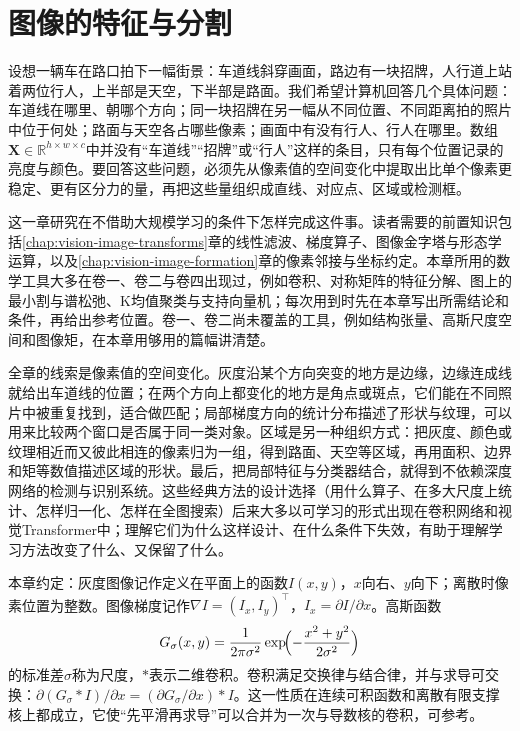 \chapter{图像的特征与分割}
\label{chap:vision-image-features}

设想一辆车在路口拍下一幅街景：车道线斜穿画面，路边有一块招牌，人行道上站着两位行人，上半部是天空，下半部是路面。我们希望计算机回答几个具体问题：车道线在哪里、朝哪个方向；同一块招牌在另一幅从不同位置、不同距离拍的照片中位于何处；路面与天空各占哪些像素；画面中有没有行人、行人在哪里。数组$\bm X\in\mathbb R^{h\times w\times c}$中并没有“车道线”“招牌”或“行人”这样的条目，只有每个位置记录的亮度与颜色。要回答这些问题，必须先从像素值的空间变化中提取出比单个像素更稳定、更有区分力的量，再把这些量组织成直线、对应点、区域或检测框。

这一章研究在不借助大规模学习的条件下怎样完成这件事。读者需要的前置知识包括\ref{chap:vision-image-transforms}章的线性滤波、梯度算子、图像金字塔与形态学运算，以及\ref{chap:vision-image-formation}章的像素邻接与坐标约定。本章所用的数学工具大多在卷一、卷二与卷四出现过，例如卷积、对称矩阵的特征分解、图上的最小割与谱松弛、K均值聚类与支持向量机；每次用到时先在本章写出所需结论和条件，再给出参考位置。卷一、卷二尚未覆盖的工具，例如结构张量、高斯尺度空间和图像矩，在本章用够用的篇幅讲清楚。

全章的线索是像素值的空间变化。灰度沿某个方向突变的地方是边缘，边缘连成线就给出车道线的位置；在两个方向上都变化的地方是角点或斑点，它们能在不同照片中被重复找到，适合做匹配；局部梯度方向的统计分布描述了形状与纹理，可以用来比较两个窗口是否属于同一类对象。区域是另一种组织方式：把灰度、颜色或纹理相近而又彼此相连的像素归为一组，得到路面、天空等区域，再用面积、边界和矩等数值描述区域的形状。最后，把局部特征与分类器结合，就得到不依赖深度网络的检测与识别系统。这些经典方法的设计选择（用什么算子、在多大尺度上统计、怎样归一化、怎样在全图搜索）后来大多以可学习的形式出现在卷积网络和视觉Transformer中；理解它们为什么这样设计、在什么条件下失效，有助于理解学习方法改变了什么、又保留了什么。

本章约定：灰度图像记作定义在平面上的函数$I(x,y)$，$x$向右、$y$向下；离散时像素位置为整数。图像梯度记作$\nabla I=(I_x,I_y)^{\top}$，$I_x=\partial I/\partial x$。高斯函数
\begin{equation}
  G_{\sigma}(x,y)=\frac{1}{2\pi\sigma^2}\exp\!\Bigl(-\frac{x^2+y^2}{2\sigma^2}\Bigr)
  \label{eq:vision-features-gaussian}
\end{equation}
的标准差$\sigma$称为尺度，$*$表示二维卷积。卷积满足交换律与结合律，并与求导可交换：$\partial(G_{\sigma}*I)/\partial x=(\partial G_{\sigma}/\partial x)*I$。这一性质在连续可积函数和离散有限支撑核上都成立，它使“先平滑再求导”可以合并为一次与导数核的卷积，可参考。

